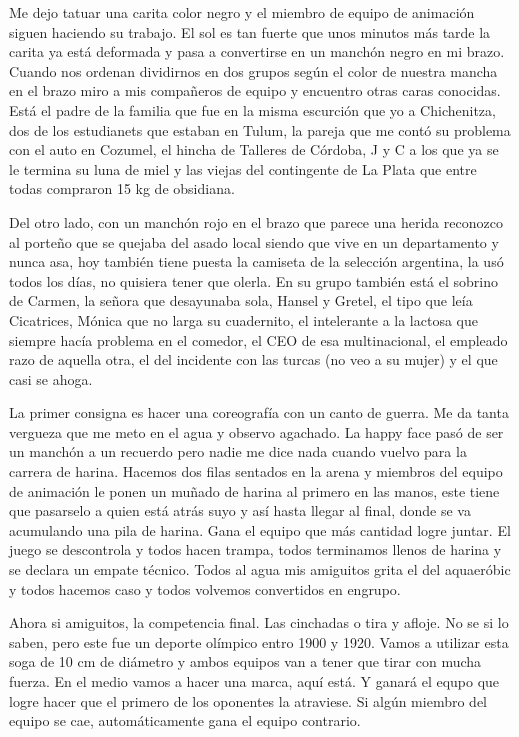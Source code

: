 \documentclass[12pt,twoside,openright,a5paper]{book}
\begin{document}
Me dejo tatuar una carita color negro y el miembro de equipo de animación
siguen haciendo su trabajo. El sol es tan fuerte que unos minutos más tarde
la carita ya está deformada y pasa a convertirse en un manchón negro en mi
brazo. Cuando nos ordenan dividirnos en dos grupos según el color de nuestra
mancha en el brazo miro a mis compañeros de equipo y encuentro otras caras
conocidas. Está el padre de la familia que fue en la misma escurción que
yo a Chichenitza, dos de los estudianets que estaban en Tulum, la pareja
que me contó su problema con el auto en Cozumel, el hincha de Talleres
de Córdoba, J y C a los que ya se le termina su luna de miel y las viejas
del contingente de La Plata que entre todas compraron 15 kg de obsidiana.

Del otro lado, con un manchón rojo en el brazo que parece una herida
reconozco al porteño que se quejaba del asado local siendo que vive en
un departamento y nunca asa, hoy también tiene puesta la camiseta de
la selección argentina, la usó todos los días, no quisiera tener que
olerla. En su grupo también está el sobrino de Carmen, la señora que
desayunaba sola, Hansel y Gretel, el tipo que leía Cicatrices, Mónica que no
larga su cuadernito, el intelerante a la lactosa que siempre hacía problema
en el comedor, el CEO de esa multinacional, el empleado razo de aquella otra,
el del incidente con las turcas (no veo a su mujer) y el que casi se ahoga.

La primer consigna es hacer una coreografía con un canto de guerra. Me da
tanta vergueza que me meto en el agua y observo agachado. La happy face pasó
de ser un manchón a un recuerdo pero nadie me dice nada cuando vuelvo para
la carrera de harina. Hacemos dos filas sentados en la arena y miembros del
equipo de animación le ponen un muñado de harina al primero en las manos,
este tiene que pasarselo a quien está atrás suyo y así hasta llegar
al final, donde se va acumulando una pila de harina. Gana el equipo que
más cantidad logre juntar. El juego se descontrola y todos hacen trampa,
todos terminamos llenos de harina y se declara un empate técnico. Todos
al agua mis amiguitos grita el del aquaeróbic y todos hacemos caso y todos
volvemos convertidos en engrupo.

Ahora si amiguitos, la competencia final. Las cinchadas o tira y afloje. No
se si lo saben, pero este fue un deporte olímpico entro 1900 y 1920. Vamos a
utilizar esta soga de 10 cm de diámetro y ambos equipos van a tener que tirar
con mucha fuerza. En el medio vamos a hacer una marca, aquí está. Y ganará
el equpo que logre hacer que el primero de los oponentes la atraviese. Si
algún miembro del equipo se cae, automáticamente gana el equipo contrario.
\end{document}
